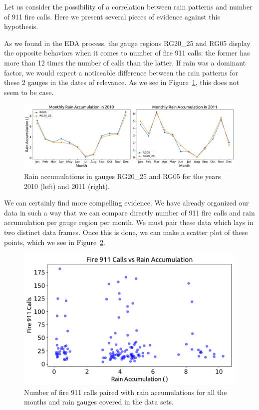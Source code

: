 \documentclass[12pt,a4paper]{article}
\begin{document}
Let us consider the possibility of a correlation between rain patterns and number of 911 fire calls. Here we present several pieces of evidence against this hypothesis.

As we found in the EDA process, the gauge regions RG20\_25 and RG05 display the opposite behaviors when it comes to number of fire 911 calls: the former has more than 12 times the number of calls than the latter. If rain was a dominant factor, we would expect a noticeable difference between the rain patterns for these 2 gauges in the dates of relevance. As we see in Figure~\ref{TwoPlots}, this does not seem to be case.

\begin{figure}[ht!]
\centering
\includegraphics[width=\textwidth]{figs/TwoPlots.pdf}
\caption{Rain accumulations in gauges RG20\_25 and RG05 for the years 2010 (left) and 2011 (right).}
\label{TwoPlots}
\end{figure}

We can certainly find more compelling evidence. We have already organized our data in such a way that we can compare directly number of 911 fire calls and rain accumulation per gauge region per month. We must pair these data which lays in two distinct data frames. Once this is done, we can make a scatter plot of these points, which we see in Figure~\ref{NoCor}.

\begin{figure}[ht!]
\centering
\includegraphics[scale=0.65]{figs/NoCor.pdf}
\caption{Number of fire 911 calls paired with rain accumulations for all the months and rain gauges covered in the data sets.}
\label{NoCor}
\end{figure}
\end{document}
